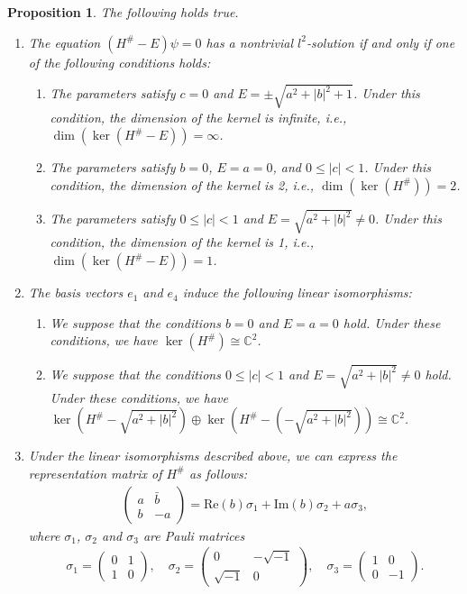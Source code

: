 \documentclass{amsart}
\newtheorem{prop}[thm]{Proposition}
\theoremstyle{definition}
\theoremstyle{remark}
\begin{document}
 \begin{prop} \label{lem:5.8}
The following holds true.
\begin{enumerate}
    \item The equation \((H^\# - E)\psi = 0\) has a nontrivial \(l^2\)-solution if and only if one of the following conditions holds:
    \begin{enumerate}
        \item The parameters satisfy \(c = 0\) and \(E = \pm \sqrt{a^2 + |b|^2 + 1}\). Under this condition, the dimension of the kernel is infinite, i.e., \(\dim(\ker(H^\# - E)) = \infty\).
        \item The parameters satisfy \(b = 0\), \(E = a = 0\), and \(0 \leq |c| < 1\). Under this condition, the dimension of the kernel is 2, i.e., \(\dim(\ker(H^\# )) = 2\).
        \item The parameters satisfy \(0 \leq |c| < 1\) and \(E = \sqrt{a^2 + |b|^2} \neq 0\). Under this condition, the dimension of the kernel is 1, i.e., \(\dim(\ker(H^\# - E)) = 1\).
    \end{enumerate}
    
    \item The basis vectors \(e_1\) and \(e_4\) induce the following linear isomorphisms:
    \begin{enumerate}
        \item We suppose that the conditions \(b = 0\) and \(E = a = 0\) hold. Under these conditions, we have \(\ker(H^\#) \cong \mathbb{C}^2\).
        \item We suppose that the conditions \(0 \leq |c| < 1\) and \(E = \sqrt{a^2 + |b|^2} \neq 0\) hold. Under these conditions, we have \(\ker(H^\# - \sqrt{a^2 + |b|^2}) \oplus \ker(H^\# - (-\sqrt{a^2 + |b|^2})) \cong \mathbb{C}^2\).
    \end{enumerate}
    
    \item Under the linear isomorphisms described above, we can express the representation matrix of \(H^\#\) as follows:
    \begin{align*}
    \begin{pmatrix}
    a & \bar{b} \\
    b & -a
    \end{pmatrix}
    = \text{Re}(b) \sigma_1 + \text{Im}(b) \sigma_2 + a \sigma_3,
    \end{align*}
    where $\sigma_1$, $\sigma_2$ and $\sigma_3$ are Pauli matrices
    \begin{align*}
    \sigma_1 = \begin{pmatrix} 0 & 1 \\ 1 & 0 \end{pmatrix}, \quad
    \sigma_2 = \begin{pmatrix} 0 & -\sqrt{-1} \\ \sqrt{-1} & 0 \end{pmatrix}, \quad
    \sigma_3 = \begin{pmatrix} 1 & 0 \\ 0 & -1 \end{pmatrix}.
    \end{align*}
\end{enumerate}
\end{prop}
\end{document}
